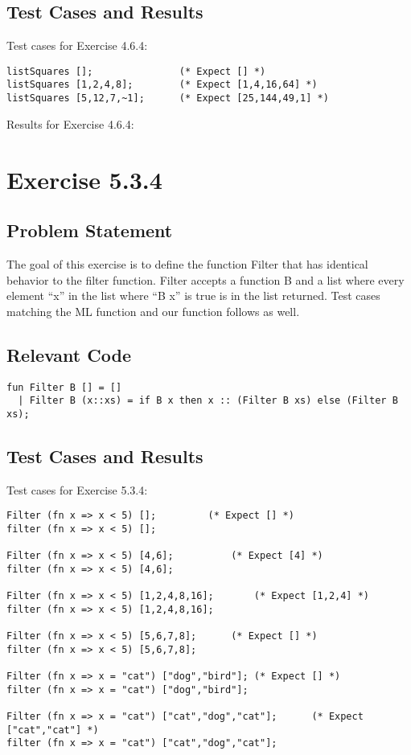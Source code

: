 \documentclass[letterpaper]{report}
\begin{document}
\section{Test Cases and Results}

Test cases for Exercise 4.6.4:
\begin{lstlisting}
listSquares [];               (* Expect [] *)
listSquares [1,2,4,8];        (* Expect [1,4,16,64] *)
listSquares [5,12,7,~1];      (* Expect [25,144,49,1] *)
\end{lstlisting}

Results for Exercise 4.6.4:


\newpage


\chapter{Exercise 5.3.4}
\label{sec:ex-5-3-4}

\section{Problem Statement}
The goal of this exercise is to define the function Filter that has identical behavior to the filter function.
Filter accepts a function B and a list where every element ``x'' in the list where ``B x'' is true is in the list
returned. Test cases matching the ML function and our function follows as well.

\section{Relevant Code}

\begin{lstlisting}
fun Filter B [] = []
  | Filter B (x::xs) = if B x then x :: (Filter B xs) else (Filter B xs);
\end{lstlisting}

\section{Test Cases and Results}

Test cases for Exercise 5.3.4:
\begin{lstlisting}
Filter (fn x => x < 5) [];		   (* Expect [] *)
filter (fn x => x < 5) [];

Filter (fn x => x < 5) [4,6];		   (* Expect [4] *)
filter (fn x => x < 5) [4,6];

Filter (fn x => x < 5) [1,2,4,8,16];	   (* Expect [1,2,4] *)
filter (fn x => x < 5) [1,2,4,8,16];

Filter (fn x => x < 5) [5,6,7,8];	   (* Expect [] *)
filter (fn x => x < 5) [5,6,7,8];

Filter (fn x => x = "cat") ["dog","bird"]; (* Expect [] *)
filter (fn x => x = "cat") ["dog","bird"];

Filter (fn x => x = "cat") ["cat","dog","cat"];	     (* Expect ["cat","cat"] *)
filter (fn x => x = "cat") ["cat","dog","cat"];
\end{lstlisting}
\end{document}

